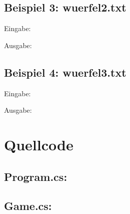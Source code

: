 \documentclass[a4paper,11pt,ngerman]{scrartcl}
\begin{document}
\subsection{Beispiel 3: wuerfel2.txt}
Eingabe:
\begin{tcolorbox}[center,width=12cm,title=Textfiles/wuerfel2.txt]
	\centering
	
\end{tcolorbox}
Ausgabe:
\centering
\begin{tcolorbox}[center,width=12cm,title=Textfiles/wuerfel2\_result.txt]
	
	
\end{tcolorbox}
\subsection{Beispiel 4: wuerfel3.txt}
Eingabe:
\begin{tcolorbox}[center,width=12cm,title=Textfiles/wuerfel3.txt]
	\centering
	
\end{tcolorbox}
Ausgabe:
\centering
\begin{tcolorbox}[center,width=12cm,title=Textfiles/wuerfel3\_result.txt]
	
	
\end{tcolorbox}

\section{Quellcode}
\subsection{Program.cs:}

\subsection{Game.cs:}

\end{document}
